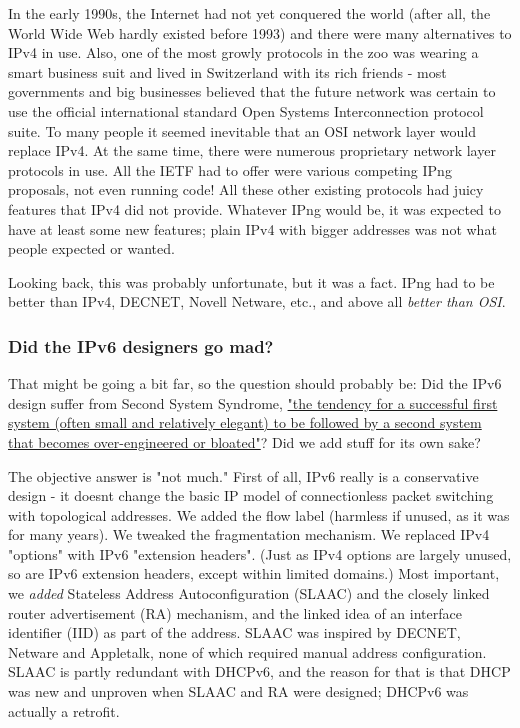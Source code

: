\documentclass[
]{article}
\begin{document}
In the early 1990s, the Internet had not yet conquered the world (after
all, the World Wide Web hardly existed before 1993) and there were many
alternatives to IPv4 in use. Also, one of the most growly protocols in
the zoo was wearing a smart business suit and lived in Switzerland with
its rich friends - most governments and big businesses believed that the
future network was certain to use the official international standard
Open Systems Interconnection protocol suite. To many people it seemed
inevitable that an OSI network layer would replace IPv4. At the same
time, there were numerous proprietary network layer protocols in use.
All the IETF had to offer were various competing IPng proposals, not
even running code! All these other existing protocols had juicy features
that IPv4 did not provide. Whatever IPng would be, it was expected to
have at least some new features; plain IPv4 with bigger addresses was
not what people expected or wanted.

Looking back, this was probably unfortunate, but it was a fact. IPng had
to be better than IPv4, DECNET, Novell Netware, etc., and above all
\emph{better than OSI}.

\subsubsection{Did the IPv6 designers go
mad?}\label{did-the-ipv6-designers-go-mad}

That might be going a bit far, so the question should probably be: Did
the IPv6 design suffer from Second System Syndrome,
\href{https://en.wikipedia.org/wiki/Second-system_effect}{"the tendency
for a successful first system (often small and relatively elegant) to be
followed by a second system that becomes over-engineered or bloated"}?
Did we add stuff for its own sake?

The objective answer is "not much." First of all, IPv6 really is a
conservative design - it doesn\textquotesingle t change the basic IP
model of connectionless packet switching with topological addresses. We
added the flow label (harmless if unused, as it was for many years). We
tweaked the fragmentation mechanism. We replaced IPv4 "options" with
IPv6 "extension headers". (Just as IPv4 options are largely unused, so
are IPv6 extension headers, except within limited domains.) Most
important, we \emph{added} Stateless Address Autoconfiguration (SLAAC)
and the closely linked router advertisement (RA) mechanism, and the
linked idea of an interface identifier (IID) as part of the address.
SLAAC was inspired by DECNET, Netware and Appletalk, none of which
required manual address configuration. SLAAC is partly redundant with
DHCPv6, and the reason for that is that DHCP was new and unproven when
SLAAC and RA were designed; DHCPv6 was actually a retrofit.
\end{document}

